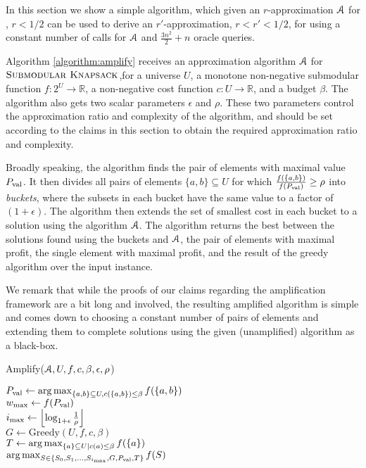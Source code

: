 \documentclass[a4paper,UKenglish,cleveref, autoref]{lipics-v2019}
\begin{document}
In this section we show a simple algorithm, which given
an $r$-approximation $\mathcal{A}$ for \SK, $r<1/2$ can
be used to derive an $r'$-approximation, $r<r' <1/2$, for
\SK using  a constant number of calls
for $\mathcal{A}$ and $\frac{3n^2}{2}+n$ oracle queries.

Algorithm \ref{algorithm:amplify} receives
an approximation algorithm $\mathcal{A}$ for ${\textsc{Submodular Knapsack}}$,for
a universe $U$, a monotone non-negative
submodular function $f:2^U \rightarrow \mathbb{R}$,
a non-negative cost function $c:U \rightarrow \mathbb{R}$, and a budget $\beta$.
The algorithm also gets two scalar parameters $\epsilon$
and $\rho$.  These two parameters control the approximation
ratio and complexity of the algorithm, and should be set according
to the claims in this section to obtain the required approximation
ratio and complexity.

Broadly speaking,  the algorithm finds the pair of  elements with maximal value $P_{\text{val}}$. It then divides all pairs of elements $\{a,b\} \subseteq U$ for which
$\frac{f(\{a,b\})}{f(P_{\text{val}})} \geq \rho$ into {\em buckets}, where the subsets
in each bucket have the same value to a factor of $(1+\epsilon)$.
The algorithm then extends the set of smallest cost in  each bucket
to a solution using the algorithm $\mathcal{A}$.  The algorithm returns the
best between the solutions found using the buckets and $\mathcal{A}$, the pair of
elements with maximal profit, the single element with maximal profit, and the result of the greedy algorithm over the input instance.

We remark that while the proofs of our claims regarding the amplification framework are a bit long and involved, the resulting amplified algorithm is simple and comes down to choosing a constant number of pairs of elements and extending them to complete solutions using the given (unamplified) algorithm as a black-box.

\begin{algorithm}
	\caption{Amplify($\mathcal{A}, U, f, c, \beta, \epsilon, \rho$)}
	\label{algorithm:amplify}
	$P_{\text{val}} \leftarrow \operatorname*{arg\,max}_{ \{a,b\} \subseteq U, c(\{a,b\})\leq \beta } f(\{a,b\})$
	\\ $w_{\max}\leftarrow f(P_{\text{val}})$
	\\ $i_{\max} \leftarrow \left\lfloor \log_{1 + \epsilon} \frac{1}{\rho} \right\rfloor$
	\\
	$G \leftarrow \text{Greedy}(U, f, c, \beta)$ \label{amplify:greedy}
	\\
	$T \leftarrow \operatorname*{arg\,max}_{\{a\}\subseteq U| c(a)\leq \beta} f(\{a\})$ \label{amplify:singletons}
	\\
	\Return $\operatorname*{arg\,max}_{S \in \{S_0, S_1, \ldots, S_{i_{\max}}, G, P_{\text{val}},T\}} f(S)$

\end{algorithm}
\end{document}

